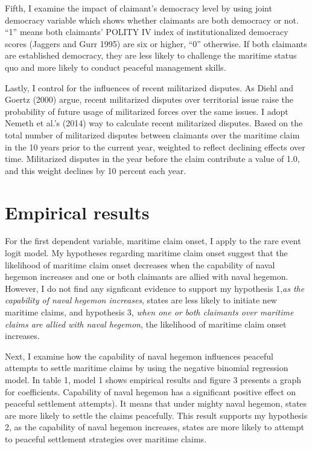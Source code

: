 \documentclass{article}
\begin{document}
Fifth, I examine the impact of claimant’s democracy level by using joint democracy variable which shows whether claimants are both democracy or not. “1” means both claimants’ POLITY IV index of institutionalized democracy scores (Jaggers and Gurr 1995) are six or higher, “0” otherwise. If both claimants are established democracy, they are less likely to challenge the maritime status quo and more likely to conduct peaceful management skills. 

Lastly, I control for the influences of recent militarized disputes. As Diehl and Goertz (2000) argue, recent militarized disputes over territorial issue raise the probability of future usage of militarized forces over the same issues. I adopt Nemeth et al.’s (2014) way to calculate recent militarized disputes. Based on the total number of militarized disputes between claimants over the maritime claim in the 10 years prior to the current year, weighted to reflect declining effects over time. Militarized disputes in the year before the claim contribute a value of 1.0, and this weight declines by 10 percent each year.

\section*{Empirical results}

\hspace{0.5cm}For the first dependent variable, maritime claim onset, I apply to the rare event logit model. My hypotheses regarding maritime claim onset suggest that the likelihood of maritime claim onset decreases when the capability of naval hegemon increases and one or both claimants are allied with naval hegemon. However, I do not find any signficant evidence to support my hypothesis 1,\emph{as the capability of naval hegemon increases}, states are less likely to initiate new maritime claims, and hypothesis 3, \emph{when one or both claimants over maritime claims are allied with naval hegemon}, the likelihood of maritime claim onset increases.

Next, I examine how the capability of naval hegemon influences peaceful attempts to settle maritime claims by using the negative binomial regression model. In table 1, model 1 shows empirical results and figure 3 presents a graph for coefficients. Capability of naval hegemon has a significant positive effect on peaceful settlement attempts). It means that under mighty naval hegemon, states are more likely to settle the claims peacefully. This result supports my hypothesis 2, as the capability of naval hegemon increases, states are more likely to attempt to peaceful settlement strategies over maritime claims. 
\end{document}
